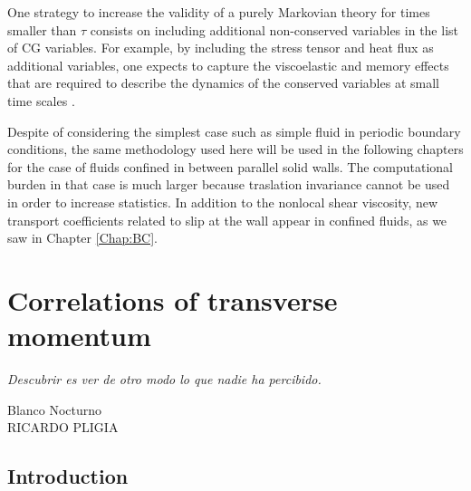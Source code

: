 \documentclass[a4paper,openright,12pt]{book}
\begin{document}
One strategy to increase the validity of a purely Markovian theory for
times   smaller  than   $\tau$   consists   on  including   additional
non-conserved variables in the list  of CG variables.  For example, by
including the stress tensor and heat flux as additional variables, one
expects  to  capture the  viscoelastic  and  memory effects  that  are
required to describe the dynamics  of the conserved variables at small
time scales \cite{Khayat1989,Mryglod1995,Bryk2010}.

Despite of considering the simplest case such as  simple fluid  in periodic  boundary conditions, the  same methodology used here  will be  used in the following chapters for  the case  of fluids
confined in between parallel solid walls.  The computational burden in
that case is much larger  because traslation invariance cannot be used
in order to increase statistics.
In  addition   to  the   nonlocal  shear  viscosity,   new  transport
coefficients related to slip at the wall appear in confined fluids, as
we saw in Chapter \ref{Chap:BC}.


\chapter{Correlations of transverse momentum}\label{Chap:Walls}
\epigraph{\textit{Descubrir es ver de otro modo lo que nadie ha percibido.}}{Blanco Nocturno \\ RICARDO PLIGIA}
\section{Introduction}
\end{document}
